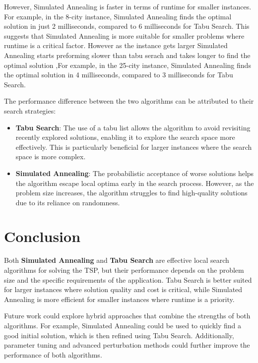 \documentclass{article}
\begin{document}
However, Simulated Annealing is faster in terms of runtime for smaller instances. For example, in the 8-city instance, Simulated Annealing finds the optimal solution in just 2 milliseconds, compared to 6 milliseconds for Tabu Search. This suggests that Simulated Annealing is more suitable for smaller problems where runtime is a critical factor. However as the instance gets larger Simulated Annealing starts preforming slower than tabu serach and takes longer to find the optimal solution ,For example, in the 25-city instance, Simulated Annealing finds the optimal solution in 4 milliseconds, compared to 3 milliseconds for Tabu Search.

The performance difference between the two algorithms can be attributed to their search strategies:
\begin{itemize}
    \item \textbf{Tabu Search}: The use of a tabu list allows the algorithm to avoid revisiting recently explored solutions, enabling it to explore the search space more effectively. This is particularly beneficial for larger instances where the search space is more complex.
    \item \textbf{Simulated Annealing}: The probabilistic acceptance of worse solutions helps the algorithm escape local optima early in the search process. However, as the problem size increases, the algorithm struggles to find high-quality solutions due to its reliance on randomness.
\end{itemize}

\section{Conclusion}
Both \textbf{Simulated Annealing} and \textbf{Tabu Search} are effective local search algorithms for solving the TSP, but their performance depends on the problem size and the specific requirements of the application. Tabu Search is better suited for larger instances where solution quality and cost is critical, while Simulated Annealing is more efficient for smaller instances where runtime is a priority.

Future work could explore hybrid approaches that combine the strengths of both algorithms. For example, Simulated Annealing could be used to quickly find a good initial solution, which is then refined using Tabu Search. Additionally, parameter tuning and advanced perturbation methods could further improve the performance of both algorithms.


 
\end{document}
